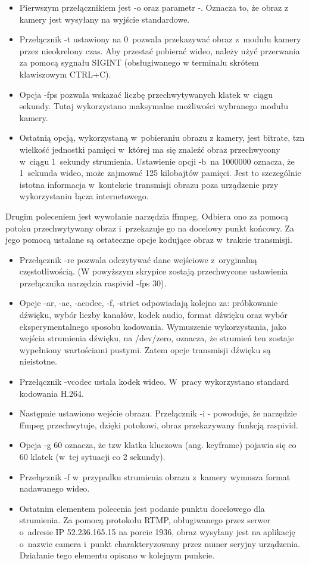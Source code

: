 \documentclass[polish,bachelor,a4paper,oneside]{ppfcmthesis}
\begin{document}
    \begin{itemize}
        \item Pierwszym przełącznikiem jest -o oraz parametr -. Oznacza to, że obraz z kamery jest wysyłany na wyjście standardowe.
        \item Przełącznik -t ustawiony na 0~pozwala przekazywać obraz z~modułu kamery przez nieokrelony czas. Aby przestać pobierać wideo, należy użyć przerwania za pomocą sygnału SIGINT (obsługiwanego w terminalu skrótem klawiszowym CTRL+C).
        \item Opcja -fps pozwala wskazać liczbę przechwytywanych klatek w~ciągu sekundy. Tutaj wykorzystano maksymalne możliwości wybranego modułu kamery.
        \item Ostatnią opcją, wykorzystaną w~pobieraniu obrazu z kamery, jest bitrate, tzn wielkość jednostki pamięci w~której ma się znaleźć obraz przechwycony w~ciągu 1~sekundy strumienia. Ustawienie opcji -b~na 1000000 oznacza, że 1~sekunda wideo, może zajmować 125 kilobajtów pamięci. Jest to szczególnie istotna informacja w~kontekcie transmisji obrazu poza urządzenie przy wykorzystaniu łącza internetowego.
    \end{itemize}

    Drugim poleceniem jest wywołanie narzędzia ffmpeg. Odbiera ono za pomocą potoku przechwytywany obraz i~przekazuje go na docelowy punkt końcowy. Za jego pomocą ustalane są ostateczne opcje kodujące obraz w~trakcie transmisji.
    \begin{itemize}
        \item Przełącznik -re pozwala odczytywać dane wejściowe z~oryginalną częstotliwością. (W powyższym skrypice zostają przechwycone ustawienia przełącznika narzędzia raspivid -fps 30).
        \item Opcje  -ar, -ac, -acodec, -f, -strict odpowiadają kolejno za: próbkowanie dźwięku, wybór liczby kanałów, kodek audio, format dźwięku oraz wybór eksperymentalnego sposobu kodowania. Wymuszenie wykorzystania, jako wejścia strumienia dźwięku, na /dev/zero, oznacza, że strumień ten zostaje wypełniony wartościami pustymi. Zatem opcje transmisji dźwięku są nieistotne.
        \item Przełącznik -vcodec ustala kodek wideo. W~pracy wykorzystano standard kodowania H.264.
        \item Następnie ustawiono wejście obrazu. Przełącznik -i - powoduje, że narzędzie ffmpeg przechwytuje, dzięki potokowi, obraz przekazywany funkcją raspivid.
        \item Opcja -g 60 oznacza, że tzw klatka kluczowa (ang. keyframe) pojawia się co 60 klatek (w~tej sytuacji co 2 sekundy).
        \item Przełącznik -f w~przypadku strumienia obrazu z~kamery wymusza format nadawanego wideo.
        \item Ostatnim elementem polecenia jest podanie punktu docelowego dla strumienia. Za pomocą protokołu RTMP, obługiwanego przez serwer o~adresie IP 52.236.165.15 na porcie 1936, obraz wysyłany jest na aplikację o~nazwie camera i~punkt charakteryzowany przez numer seryjny urządzenia. Działanie tego elementu opisano w kolejnym punkcie.
    \end{itemize}
\end{document}
